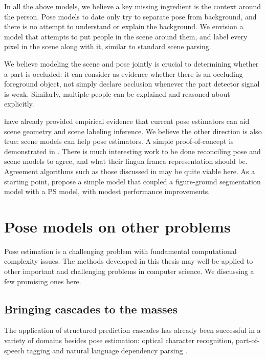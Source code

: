 In all the above models, we believe a key missing ingredient is the context 
around the person.  Pose models to date only try to separate pose from 
background, and there is no attempt to understand or explain the background.  
We envision a model that attempts to put people in the scene around them, and 
label every pixel in the scene along with it, similar to standard scene 
parsing.  

We believe modeling the scene and pose jointly is crucial to determining 
whether a part is occluded: it can consider as evidence whether there is an 
occluding foreground object, not simply declare occlusion whenever the part 
detector signal is weak. Similarly, multiple people can be explained and 
reasoned about explicitly. 

\citet{gupta11,delaitre12} have already provided empirical evidence that 
current pose estimators can aid scene geometry and scene labeling inference.  
We believe the other direction is also true: scene models can help pose 
estimators.  A simple proof-of-concept is demonstrated in .  
There is much interesting work to be done reconciling pose and scene models to 
agree, and what their lingua franca representation should be.  Agreement 
algorithms such as those discussed in  may be quite viable 
here.  As a starting point, \cite{koller11} propose a simple model that coupled 
a figure-ground segmentation model with a PS model, with modest performance 
improvements.
 
\section{Pose models on other problems}

Pose estimation is a challenging problem with fundamental computational 
complexity issues.  The methods developed in this thesis may well be applied to 
other important and challenging problems in computer science.  We discussing a 
few promising ones here.

\subsection{Bringing cascades to the masses}
The application of structured prediction cascades has already been successful 
in a variety of domains besides pose estimation: optical character recognition, 
part-of-speech tagging \citep{cascades-jmlr} and natural language dependency 
parsing \citep{slav-naacl}.

